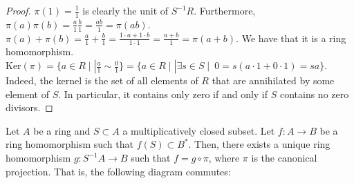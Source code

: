             \begin{proof}
                $\pi(1) = \frac{1}{1}$ is clearly the unit of $S^{-1}R$.
                Furthermore, $\pi(a) \pi(b) = \frac{a}{1} \frac{b}{1} = \frac{ab}{1} = \pi(ab)$.
                $\pi(a) + \pi(b) = \frac{a}{1} + \frac{b}{1} = \frac{1 \cdot a + 1 \cdot b}{1 \cdot 1} = \frac{a+b}{1} = \pi(a + b)$.
                We have that it is a ring homomorphism. $\text{Ker}(\pi) = \{a \in R \mid | \frac{a}{1} \sim \frac{0}{1}\} =
                \{a \in R \mid | \exists s \in S \mid \ 0 = s (a \cdot 1 + 0 \cdot 1) = sa\}$.
                Indeed, the kernel is the set of all elements of $R$ that are annihilated by some element of $S$.
                In particular, it contains only zero if and only if $S$ contains no zero divisors.
            \end{proof}

        \begin{prop} \label{prop:universal-property-fractions}
            Let $A$ be a ring and $S \subset A$ a multiplicatively closed subset.
            Let $f: A \rightarrow B$ be a ring homomorphism such that $f(S) \subset B^*$.
            Then, there exists a unique ring homomorphism
            $g: S^{-1}A \rightarrow B$ such that $f = g \circ \pi$, where $\pi$
            is the canonical projection.
            That is, the following diagram commutes:

            \begin{center}
            \end{center}

        \end{prop}

